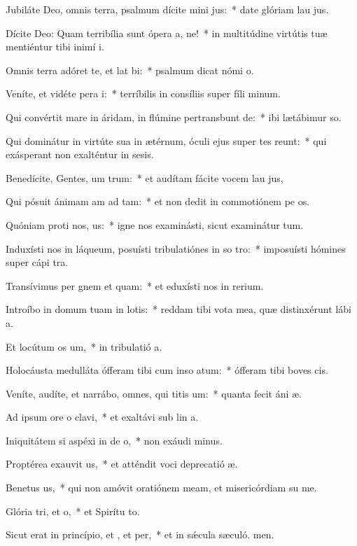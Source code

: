 \item Jubiláte Deo, omnis terra, psalmum dícite mini jus:~* date glóriam lau jus.
\item Dícite Deo: Quam terribília sunt ópera a, ne!~* in multitúdine virtútis tuæ mentiéntur tibi inimí i.
\item Omnis terra adóret te, et lat bi:~* psalmum dicat nómi o.
\item Veníte, et vidéte pera i:~* terríbilis in consíliis super fíli minum.
\item Qui convértit mare in áridam, in flúmine pertransbunt de:~* ibi lætábimur  so.
\item Qui dominátur in virtúte sua in ætérnum, óculi ejus super tes reunt:~* qui exásperant non exalténtur in sesis.
\item Benedícite, Gentes, um trum:~* et audítam fácite vocem lau jus,
\item Qui pósuit ánimam am ad tam:~* et non dedit in commotiónem pe os.
\item Quóniam proti nos, us:~* igne nos examinásti, sicut examinátur tum.
\item Induxísti nos in láqueum, posuísti tribulatiónes in so tro:~* imposuísti hómines super cápi tra.
\item Transívimus per gnem et quam:~* et eduxísti nos in rerium.
\item Introíbo in domum tuam in lotis:~* reddam tibi vota mea, quæ distinxérunt lábi a.
\item Et locútum  os um,~* in tribulatió a.
\item Holocáusta medulláta ófferam tibi cum inso atum:~* ófferam tibi boves  cis.
\item Veníte, audíte, et narrábo, omnes, qui titis um:~* quanta fecit áni æ.
\item Ad ipsum ore o clavi,~* et exaltávi sub lin a.
\item Iniquitátem si aspéxi in de o,~* non exáudi minus.
\item Proptérea exauvit us,~* et atténdit voci deprecatió æ.
\item Benetus us,~* qui non amóvit oratiónem meam, et misericórdiam su  me.
\item Glória tri, et o,~* et Spirítu to.
\item Sicut erat in princípio, et , et per,~* et in sǽcula sæculó. men.
